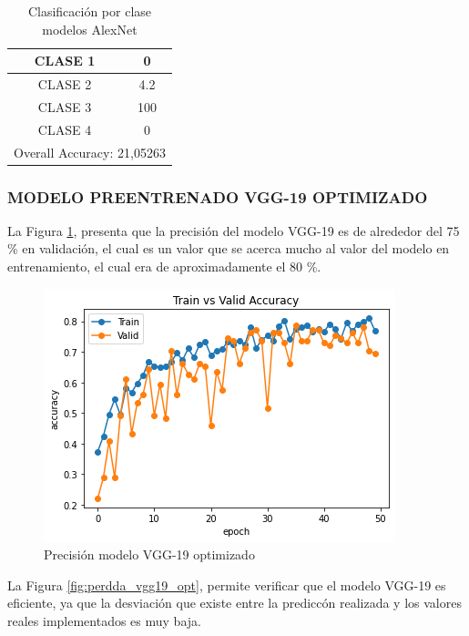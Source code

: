 		\begin{table}[htbp]
			\centering
			\begin{tabular}{|c|c|}
				\hline
				CLASE 1 & 0 \bigstrut\\
				\hline
				CLASE 2 & 4.2 \bigstrut\\
				\hline
				CLASE 3 & 100 \bigstrut\\
				\hline
				CLASE 4 & 0 \bigstrut\\
				\hline
				\multicolumn{2}{|c|}{Overall Accuracy: 21,05263} \bigstrut\\
				\hline
			\end{tabular}%
			\caption{Clasificación por clase modelos AlexNet}
			\label{tab:Alexoptclases}%
		\end{table}%
	
	
	\newpage
	\subsubsection{\MakeUppercase{Modelo preentrenado VGG-19 optimizado}}
	La Figura \ref{fig:preci_vgg19_OPT}, presenta que la precisión del modelo VGG-19 es de alrededor del 75 \% en validación, el cual es un valor que se acerca mucho al valor del modelo en entrenamiento, el cual era de aproximadamente el 80 \%.
 		\begin{figure}[ht]
			\centering
			\includegraphics[scale=0.6]{Figs/504.png}
			\caption{Precisión modelo VGG-19 optimizado}
			\label{fig:preci_vgg19_OPT}
		\end{figure}
	
	La Figura \ref{fig:perdda_vgg19_opt}, permite verificar que el modelo VGG-19 es eficiente, ya que la desviación que existe entre la prediccón realizada y los valores reales implementados es muy baja.
	
